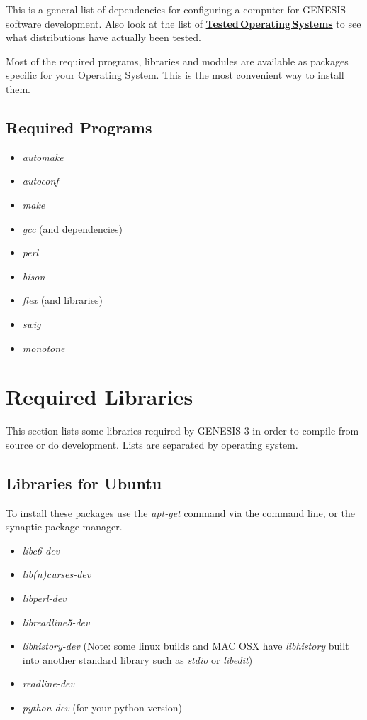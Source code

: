 \documentclass[12pt]{article}
\begin{document}
This is a general list of dependencies for configuring a computer for
GENESIS software development.  Also look at the list of \href{../tested-distributions/tested-distributions.tex}{\bf Tested\,Operating\,Systems} to see what distributions have actually
been tested.

Most of the required programs, libraries and modules are available as
packages specific for your Operating System.  This is the most convenient way to install them.

\subsection*{Required Programs}

\begin{itemize}
\item {\it automake}
\item {\it autoconf}
\item {\it make}
\item {\it gcc} (and dependencies)
\item {\it perl}
\item {\it bison}
\item {\it flex} (and libraries)
\item {\it swig}
\item {\it monotone}
\end{itemize} 

\section*{Required Libraries}

This section lists some libraries required by GENESIS-3 in order to compile from source or do development. Lists are separated by operating system. 

\subsection*{Libraries for Ubuntu}

To install these packages use the {\it apt-get} command via the command line, or the synaptic package manager. 

\begin{itemize}
\item {\it libc6-dev}
\item {\it lib(n)curses-dev}
\item {\it libperl-dev}
\item {\it libreadline5-dev}
\item {\it libhistory-dev} (Note: some linux builds and MAC OSX have
  {\it libhistory} built into another standard library such as {\it
    stdio} or {\it libedit})
\item {\it readline-dev}
\item {\it python-dev} (for your python version)
\end{itemize} 
\end{document}
